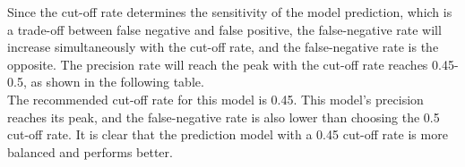 \documentclass[11pt]{article}
\begin{document}
{Since the cut-off rate determines the sensitivity of the model prediction, which is a trade-off between false negative and false positive, the false-negative rate will increase simultaneously with the cut-off rate, and the false-negative rate is the opposite. The precision rate will reach the peak with the cut-off rate reaches 0.45-0.5, as shown in the following table.\\

The recommended cut-off rate for this model is 0.45. This model's precision reaches its peak, and the false-negative rate is also lower than choosing the 0.5 cut-off rate. It is clear that the prediction model with a 0.45 cut-off rate is more balanced and performs better.\\
}
\end{document}
